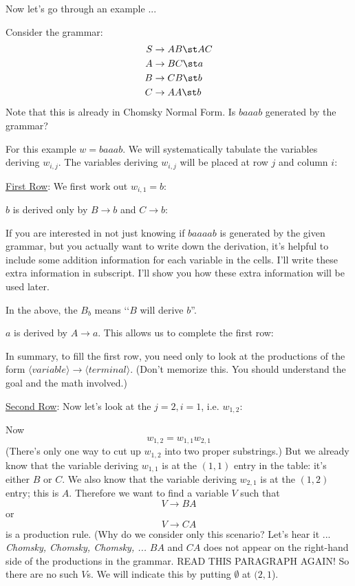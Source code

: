 Now let's go through an example ...


\newpage
\begin{eg}
Consider the grammar:
\begin{align*}
S &\rightarrow AB \st AC \\
A &\rightarrow BC \st a \\
B &\rightarrow CB \st b \\
C &\rightarrow AA \st b
\end{align*}
Note that this is already in Chomsky Normal Form.
Is $baaab$ generated by the grammar?
\end{eg}

\SOLUTION
For this example $w = baaab$.
We will systematically tabulate the variables deriving $w_{i,j}$.
The variables deriving $w_{i,j}$ will be placed at row $j$ and column $i$:


\underline{First Row}:
We first work out $w_{i,1} = b$:


$b$ is derived only by $B \rightarrow b$ and $C \rightarrow b$:

If you are interested in not just knowing if $baaaab$ is generated by the given grammar,
but you actually want to write down the derivation, it's helpful to include
some addition information for each variable in the cells.
I'll write these extra information in subscript.
I'll show you how these extra information will be used later.

In the above, the $B_b$ means \lq\lq $B$ will derive $b$''.

$a$ is derived by $A \rightarrow a$. This allows us to complete
the first row:


In summary, to fill the first row, you need only to look at the
productions of the form $\langle variable \rangle \rightarrow \langle terminal
\rangle$.
(Don't memorize this. You should understand the goal and the math involved.)

\underline{Second Row}:
Now let's look at the $j=2, i=1$, i.e. $w_{1, 2}$:

Now
\[
w_{1,2} = w_{1,1} w_{2,1}
\]
(There's only one way to cut up $w_{1,2}$ into two proper substrings.)
But we already know that the variable deriving $w_{1,1}$ is at the $(1,1)$
entry in the table: it's either $B$ or $C$.
We also know that the variable deriving $w_{2,1}$ is at the $(1,2)$ entry;
this is $A$.
Therefore we want to find a variable $V$ such that 
\[
V \rightarrow BA
\]
or
\[
V \rightarrow CA
\]
is a production rule.
(Why do we consider only this scenario? Let's hear it ... 
\textit{ Chomsky, Chomsky, Chomsky, ...}
$BA$ and $CA$ does not appear on the right-hand side of the productions in 
the grammar.
READ THIS PARAGRAPH AGAIN!
So there are no such $V$s.
We will indicate this by putting $\emptyset$ at $(2, 1$).

